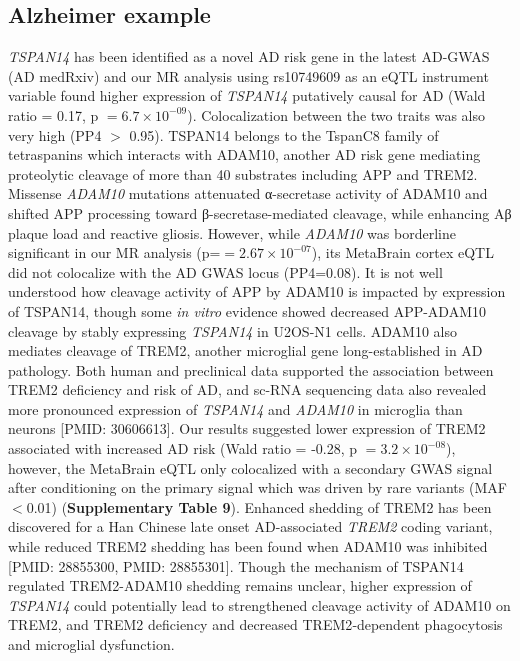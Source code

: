 \subsection{Alzheimer example}
\emph{TSPAN14} has been identified as a novel AD risk gene in the latest AD-GWAS (AD medRxiv) and our MR analysis using rs10749609 as an eQTL instrument variable found higher expression of \emph{TSPAN14} putatively causal for AD (Wald ratio = 0.17, p $= 6.7 \times 10^{-09}$). Colocalization between the two traits was also very high (PP4 $>$ 0.95). TSPAN14 belongs to the TspanC8 family of tetraspanins which interacts with ADAM10​, another AD risk gene mediating proteolytic cleavage of more than 40 substrates including APP and TREM2\cite{matthewsRegulationLeukocytesTspanC82018}. Missense \emph{ADAM10} mutations attenuated α-secretase activity of ADAM10 and shifted APP processing toward β-secretase-mediated cleavage, while enhancing Aβ plaque load and reactive gliosis\cite{suhADAM10MissenseMutations2013}. However, while \emph{ADAM10} was borderline significant in our MR analysis (p=$= 2.67 \times 10^{-07}$), its MetaBrain cortex eQTL did not colocalize with the AD GWAS locus (PP4=0.08). It is not well understood how cleavage activity of APP by ADAM10 is impacted by expression of TSPAN14, though some \emph{in vitro} evidence showed decreased APP-ADAM10 cleavage by stably expressing \emph{TSPAN14} in U2OS-N1 cells\cite{jouannetTspanC8TetraspaninsDifferentially2016}. ADAM10 also mediates cleavage of TREM2, another microglial gene long-established in AD pathology\cite{ullandTREM2KeyPlayer2018}. Both human and preclinical data supported the association between TREM2 deficiency and risk of AD\cite{ullandTREM2KeyPlayer2018}, and sc-RNA sequencing data also revealed more pronounced expression of \emph{TSPAN14} and \emph{ADAM10} in microglia than neurons [PMID: 30606613]. Our results suggested lower expression of TREM2 associated with increased AD risk (Wald ratio = -0.28, p $= 3.2 \times 10^{-08}$), however, the MetaBrain eQTL only colocalized with a secondary GWAS signal after conditioning on the primary signal which was driven by rare variants (MAF$<$0.01) (\textbf{Supplementary Table 9}). Enhanced shedding of TREM2 has been discovered for a Han Chinese late onset AD-associated \emph{TREM2} coding variant, while reduced TREM2 shedding has been found when ADAM10 was inhibited [PMID: 28855300, PMID: 28855301]. Though the mechanism of TSPAN14 regulated TREM2-ADAM10 shedding remains unclear, higher expression of \emph{TSPAN14} could potentially lead to strengthened cleavage activity of ADAM10 on TREM2, and TREM2 deficiency and decreased TREM2‐dependent phagocytosis and microglial dysfunction. 

